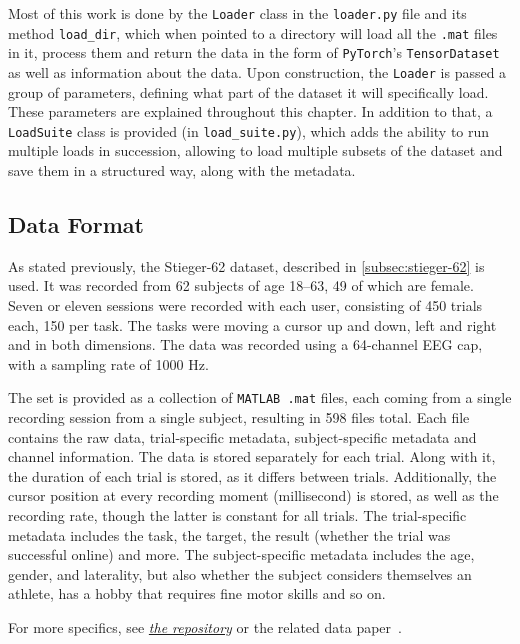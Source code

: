 \documentclass[english, he, bc, kiv, iso690alph, viewonly]{fasthesis}
\begin{document}
Most of this work is done by the \texttt{Loader} class in the \texttt{loader.py} file and its method \texttt{load\_dir}, which when pointed to a directory will load all the \texttt{.mat} files in it, process them and return the data in the form of \texttt{PyTorch}'s \texttt{TensorDataset} as well as information about the data. Upon construction, the \texttt{Loader} is passed a group of parameters, defining what part of the dataset it will specifically load. These parameters are explained throughout this chapter. In addition to that, a \texttt{LoadSuite} class is provided (in \texttt{load\_suite.py}), which adds the ability to run multiple loads in succession, allowing to load multiple subsets of the dataset and save them in a structured way, along with the metadata.

\subsection{Data Format}

As stated previously, the Stieger-62 dataset, described in \ref{subsec:stieger-62} is used. It was recorded from 62 subjects of age 18--63, 49 of which are female. Seven or eleven sessions were recorded with each user, consisting of 450 trials each, 150 per task. The tasks were moving a cursor up and down, left and right and in both dimensions. The data was recorded using a 64-channel EEG cap, with a sampling rate of 1000 Hz.

The set is provided as a collection of \texttt{MATLAB .mat} files, each coming from a single recording session from a single subject, resulting in 598 files total. Each file contains the raw data, trial-specific metadata, subject-specific metadata and channel information.
The data is stored separately for each trial. Along with it, the duration of each trial is stored, as it differs between trials. Additionally, the cursor position at every recording moment (millisecond) is stored, as well as the recording rate, though the latter is constant for all trials.
The trial-specific metadata includes the task, the target, the result (whether the trial was successful online) and more.
The subject-specific metadata includes the age, gender, and laterality, but also whether the subject considers themselves an athlete, has a hobby that requires fine motor skills and so on.

For more specifics, see \href{https://figshare.com/articles/dataset/Human_EEG_Dataset_for_Brain-Computer_Interface_and_Meditation/13123148?file=25302482}{\textit{the repository}} or the related data paper~\cite{data:stieger:21}.
\end{document}
